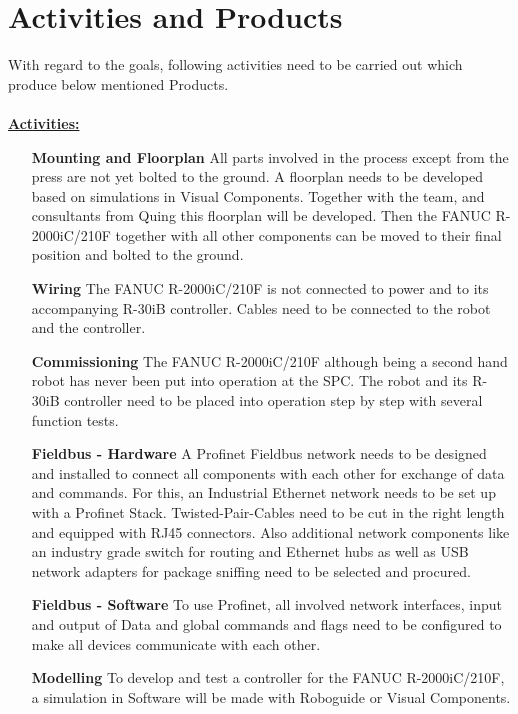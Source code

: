 
\chapter{Activities and Products}

With regard to the goals, following activities need to be carried out which produce below mentioned Products.\\
\\
\underline{\textbf{Activities:}}\vspace{2mm}
\begin{itemize}[leftmargin=5cm]
	\item[\textbf{Mounting and Floorplan}] All parts involved in the process except from the press are not yet bolted to the ground. A floorplan needs to be developed based on simulations in Visual Components. Together with the team, and consultants from Quing this floorplan will be developed. Then the FANUC R-2000iC/210F together with all other components can be moved to their final position and bolted to the ground.
	\item[\textbf{Wiring}] The FANUC R-2000iC/210F is not connected to power and to its accompanying R-30iB controller. Cables need to be connected to the robot and the controller.
	\item[\textbf{Commissioning}] The FANUC R-2000iC/210F although being a second hand robot has never been put into operation at the SPC. The robot and its R-30iB controller need to  be placed into operation step by step with several function tests.
	\item[\textbf{Fieldbus - Hardware}] A Profinet Fieldbus network needs to be designed and installed to connect all components with each other for exchange of data and commands. For this, an Industrial Ethernet network needs to be set up with a Profinet Stack. Twisted-Pair-Cables need to be cut in the right length and equipped with RJ45 connectors. Also additional network components like an industry grade switch for routing and Ethernet hubs as well as USB network adapters for package sniffing need  to be selected and procured. 
	\item[\textbf{Fieldbus - Software}] To use Profinet, all involved network interfaces, input and output of Data and global commands and flags need to be configured to make all devices communicate with each other.   
	\item[\textbf{Modelling}] To develop and test a controller for the FANUC R-2000iC/210F, a simulation in Software will be made with Roboguide or Visual Components.

\end{itemize}
